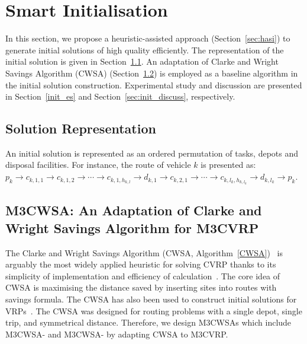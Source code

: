 \documentclass[journal]{IEEEtran}
\begin{document}
\section{Smart Initialisation}\label{sec:initial_solution}
In this section, we propose a heuristic-assisted approach (Section~\ref{sec:hasi}) to generate initial solutions of high quality efficiently. The representation of the initial solution is given in Section~\ref{init_sr}. An adaptation of Clarke and Wright Savings Algorithm (CWSA) (Section~\ref{m3_cwsa}) \cite{clarke1964scheduling} is employed as a baseline algorithm in the initial solution construction. Experimental study and discussion are presented in Section~\ref{init_es} and Section~\ref{sec:init_discuss}, respectively.

\subsection{Solution Representation}\label{init_sr}
An initial solution is represented as an ordered permutation of tasks, depots and disposal facilities. For instance, the route of vehicle $k$ is presented as: $p_k\rightarrow c_{k,1,1} \rightarrow c_{k,1,2} \rightarrow \cdots \rightarrow c_{k,1,h_{k,l}} \rightarrow d_{k,1} \rightarrow c_{k,2,1} \rightarrow \cdots \rightarrow c_{k,l_k, h_{k,l_k}} \rightarrow d_{k,l_k} \rightarrow p_k$.

\subsection{M3CWSA: An Adaptation of Clarke and Wright Savings Algorithm for M3CVRP}\label{m3_cwsa}

The Clarke and Wright Savings Algorithm (CWSA, Algorithm~\ref{CWSA})~\cite{pichpibul2012an} is arguably the most widely applied heuristic for solving CVRP thanks to its simplicity of implementation and efficiency of calculation~\cite{clarke1964scheduling,pichpibul2012an}. The core idea of CWSA is maximising the distance saved by inserting sites into routes with savings formula. The CWSA has also been used to construct initial solutions for VRPs~\cite{arnold2019knowledge-guided, arnold2019efficiently}. The CWSA was designed for routing problems with a single depot, single trip, and symmetrical distance. Therefore, we design M3CWSAs which include M3CWSA-\uppercase\expandafter{} and M3CWSA-\uppercase\expandafter{} by adapting CWSA to M3CVRP.
\end{document}

